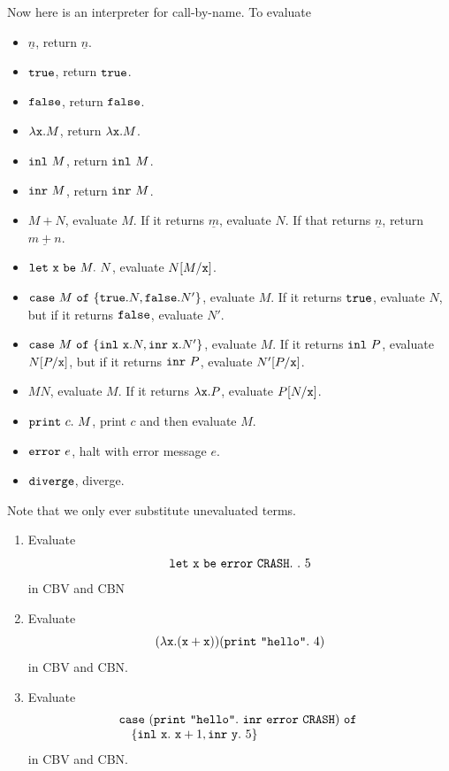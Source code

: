 \documentclass[runningheads,12pt]{llncs}
\newcommand{\ttletmac}[2]{\mathtt{let}\ {#2}\ \mathtt{be}\ {#1}.\ }
\begin{document}
Now here is an interpreter for call-by-name.  To evaluate
\begin{itemize}
\item  $\underline{n}$, return $\underline{n}$.
\item $\mathtt{true}$, return $\mathtt{true}$.
\item $\mathtt{false}$, return $\mathtt{false}$.
\item $\lambda \mathtt{x}. M$, return $\lambda \mathtt{x}. M$.
\item $\mathtt{inl} \  {M}$, return $\mathtt{inl} \  {M}$. 
\item $\mathtt{inr} \  {M}$, return $\mathtt{inr} \  {M}$. 
\item $M+N$, evaluate $M$.  If it returns $\underline{m}$, evaluate $N$.  If that returns $\underline{n}$, return $\underline{m+n}$.
\item $\ttletmac{ M }{ \ttx } N$, evaluate $N[M/\mathtt{x}]$.
\item $\mathtt{case} \  M \ \mathtt{of}\  \{ \mathtt{true}. N, \mathtt{false}. N' \}$, evaluate $M$.  If it returns $\mathtt{true}$, evaluate $N$, but if it returns $\mathtt{false}$, evaluate $N'$.
\item $\mathtt{case} \  M \ \mathtt{of}\  \{ \mathtt{inl} \  {\mathtt{x}}. N, \mathtt{inr} \  {\mathtt{x}}. N' \}$, evaluate $M$.  If it returns $\mathtt{inl} \  {P}$, evaluate $N[P/\mathtt{x}]$, but if it returns $\mathtt{inr} \  {P}$, evaluate $N'[P/\mathtt{x}]$.
\item $MN$, evaluate $M$.  If it returns $\lambda \mathtt{x}. P$, evaluate $P[N/\mathtt{x}]$.
\item $\mathtt{print}\  {c}.\ M$, print $c$ and then evaluate $M$.
\item $\mathtt{error}\  e$, halt with error message $e$.
\item $\mathtt{diverge}$, diverge.
\end{itemize}
Note that we only ever substitute unevaluated terms.

\begin{exercise}
  \begin{enumerate}
  \item Evaluate
   \begin{displaymath}
      \ttletmac{ \tterror \mathtt{CRASH} }{ \ttx } \ttin 5
    \end{displaymath}
in CBV and CBN
 \item Evaluate
   \begin{displaymath}
   ( \lambda \mathtt{x}. (\mathtt{x} + \mathtt{x}) ) (\mathtt{print}\  {\mbox{\texttt{"hello"}}}.\ {4})
   \end{displaymath}
in CBV and CBN.
\item Evaluate
  \begin{displaymath}
    \begin{array}{l}
    \mathtt{case} \  (\mathtt{print}\  {\mbox{\texttt{"hello"}}}.\ {\mathtt{inr} \  {\mathtt{error}\  \mathtt{CRASH}}}) \ \mathtt{of}\  \\
 \hspace{1em} \{ \mathtt{inl} \  {\mathtt{x}}.\ \mathtt{x}+1, \mathtt{inr} \  {\mathtt{y}}.\ 5 \}
  \end{array}
  \end{displaymath}
in CBV and CBN.
\end{enumerate}
\end{exercise}
\end{document}
